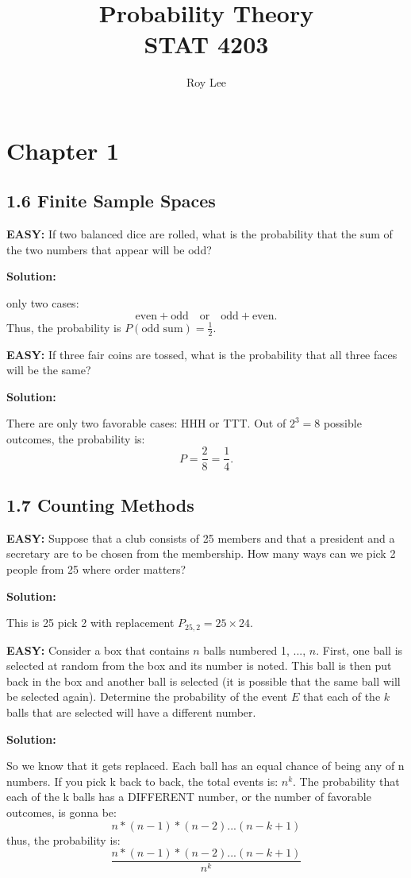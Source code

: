\documentclass[12pt]{article}
\title{Probability Theory \\ STAT 4203}
\author{Roy Lee}
\date{}  %
\newcommand{\solution}{\noindent\textbf{Solution:}\par\nopagebreak}
\newcommand{\easy}[1]{\noindent\textcolor{OliveGreen}{\textbf{EASY:}} #1 \par}
\begin{document}
\maketitle

\section{Chapter 1}

\subsection*{1.6 Finite Sample Spaces}

\easy{If two balanced dice are rolled, what is the probability that the sum of the two numbers that appear will be odd?}

\solution
only two cases:
\[
\text{even} + \text{odd} \quad \text{or} \quad \text{odd} + \text{even}.
\]
Thus, the probability is \( P(\text{odd sum}) = \frac{1}{2} \).

\easy{If three fair coins are tossed, what is the probability that all three faces will be the same?}

\solution
There are only two favorable cases: HHH or TTT. Out of \(2^3 = 8\) possible outcomes, the probability is:
\[
P = \frac{2}{8} = \frac{1}{4}.
\]

\subsection*{1.7 Counting Methods}


\easy{Suppose that a club consists of 25 members and that a president and a secretary are to be chosen from the membership. How many ways can we pick 2 people from 25 where order matters?}

\solution
This is 25 pick 2 with replacement \( P_{25,2} = 25 \times 24 \).

\easy{Consider a box that contains \( n \) balls numbered 1, ..., \( n \). First, one ball is selected at random from the box and its number is noted. This ball is then put back in the box and another ball is selected (it is possible that the same ball will be selected again). Determine the probability of the event \( E \) that each of the \( k \) balls that are selected will have a different number.}
\solution
So we know that it gets replaced. Each ball has an equal chance of being any of n numbers. If you pick k back to back, the total events is:
\(n^k\). The probability that each of the k balls has a DIFFERENT number, or the number of favorable outcomes, is gonna be:
\[
n  * (n-1)  * (n-2) ... (n-k+1)\]
thus, the probability is:
\[
\frac{
    n  * (n-1)  * (n-2) ... (n-k+1)
}{
    n^k
}\]
\end{document}
